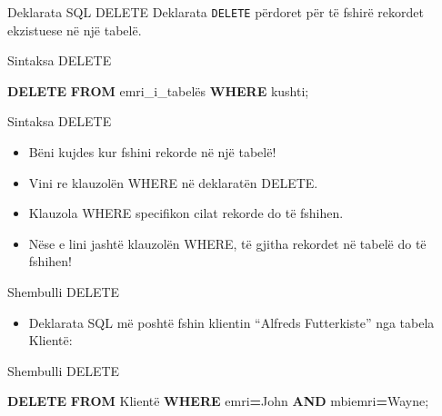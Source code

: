 \documentclass[
  ignorenonframetext,
]{beamer}
\newenvironment{Shaded}{\begin{snugshade}}{\end{snugshade}}
\newcommand{\KeywordTok}[1]{\textcolor[rgb]{0.13,0.29,0.53}{\textbf{#1}}}
\newcommand{\NormalTok}[1]{#1}
\newcommand{\OperatorTok}[1]{\textcolor[rgb]{0.81,0.36,0.00}{\textbf{#1}}}
\newcommand{\StringTok}[1]{\textcolor[rgb]{0.31,0.60,0.02}{#1}}
\providecommand{\tightlist}{%
  \setlength{\itemsep}{0pt}\setlength{\parskip}{0pt}}
\begin{document}
\begin{frame}[fragile]{Deklarata SQL DELETE}
\label{deklarata-sql-delete}
Deklarata \texttt{DELETE} përdoret për të fshirë rekordet ekzistuese në
një tabelë.
\end{frame}

\begin{frame}[fragile]{Sintaksa DELETE}
\label{sintaksa-delete}
\begin{Shaded}
\begin{Highlighting}[]
\KeywordTok{DELETE} \KeywordTok{FROM}\NormalTok{ emri\_i\_tabelës }\KeywordTok{WHERE}\NormalTok{ kushti;}
\end{Highlighting}
\end{Shaded}
\end{frame}

\begin{frame}{Sintaksa DELETE}
\label{sintaksa-delete-1}
\begin{itemize}
\item
  Bëni kujdes kur fshini rekorde në një tabelë!
\item
  Vini re klauzolën WHERE në deklaratën DELETE.
\item
  Klauzola WHERE specifikon cilat rekorde do të fshihen.
\item
  Nëse e lini jashtë klauzolën WHERE, të gjitha rekordet në tabelë do të
  fshihen!
\end{itemize}
\end{frame}

\begin{frame}{Shembulli DELETE}
\label{shembulli-delete}
\begin{itemize}
\tightlist
\item
  Deklarata SQL më poshtë fshin klientin ``Alfreds Futterkiste'' nga
  tabela Klientë:
\end{itemize}
\end{frame}

\begin{frame}[fragile]{Shembulli DELETE}
\label{shembulli-delete-1}

\begin{Shaded}
\begin{Highlighting}[]
\KeywordTok{DELETE} \KeywordTok{FROM}\NormalTok{ Klientë }\KeywordTok{WHERE}\NormalTok{ emri}\OperatorTok{=}\StringTok{\textquotesingle{}John\textquotesingle{}} \KeywordTok{AND}\NormalTok{ mbiemri}\OperatorTok{=}\StringTok{\textquotesingle{}Wayne\textquotesingle{}}\NormalTok{;}
\end{Highlighting}
\end{Shaded}
\end{frame}
\end{document}

